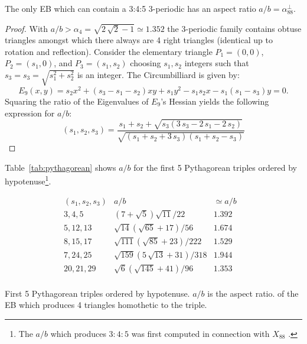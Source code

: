 \begin{proposition}
The only EB which can contain a 3:4:5 3-periodic has an aspect ratio $a/b=\alpha_{88}^\perp$.
\end{proposition}

\begin{proof}
With $a/b>\alpha_4=\sqrt{2\,\sqrt{2}-1}\simeq{1.352}$ the 3-periodic family contains obtuse triangles amongst which there always are 4 right triangles (identical up to rotation and reflection). Consider the elementary triangle $P_1=(0,0)$, $P_2=(s_1,0)$, and $P_3=(s_1,s_2)$ choosing $s_1,s_2$ integers such that $s_3=s_3=\sqrt{s_1^2+s_2^2}$ is an integer. The Circumbilliard \cite{garcia2020-new-properties} is given by:
%
\[
E_9(x,y)= s_2 x^2+ \left( s_3-s_1-s_2 \right) xy+s_1{y}^{2}-s_1s_2x-s_1 \left( s_1-s_3 \right) y=0.\]
%
Squaring the ratio of the Eigenvalues of $E_9$'s Hessian yields the following expression for $a/b$:
%
\begin{equation}
    [a/b](s_1,s_2,s_3)= \frac {s_1+s_2+\sqrt {s_3\left(3\,s_3-2\,s_1-2\,s_2\right) }}{\sqrt { \left( 
s_1+s_2+3\,s_3 \right)  \left( s_1+s_2-s_3 \right) }}
\end{equation}
\end{proof}



\noindent Table~\ref{tab:pythagorean} shows $a/b$ for the first 5 Pythagorean triples ordered by hypotenuse\footnote{The $a/b$ which produces $3:4:5$ was first computed in connection with $X_{88}$ \cite{helman2020-private-x88}.}.
%
{\small  
\begin{table}
$$
\begin{array}{r|c|l|l}
(s_1,s_2,s_3) & a/b & {\simeq}a/b \\
\hline
3, 4, 5 & {(7+\sqrt{5})\sqrt{11}}/{22} &  1.392  \\
5, 12, 13 & {\sqrt{14} (\sqrt{65}+17)}/{56} & 1.674  \\
8, 15, 17 & {\sqrt{111} (\sqrt{85}+23)}/{222} & 1.529 \\
7, 24, 25  & {\sqrt{159} (5\,\sqrt{13}+31)}/{318} & 1.944 \\
20, 21, 29 & \sqrt{6} (\sqrt{145}+41)/{96} & 1.353 &   \\
\end{array}
$$
\caption{First 5 Pythagorean triples ordered by hypotenuse. $a/b$ is the aspect ratio.
of the EB which produces 4 triangles homothetic to the triple.}
\label{tab:pythagorean}
\end{table}
}

